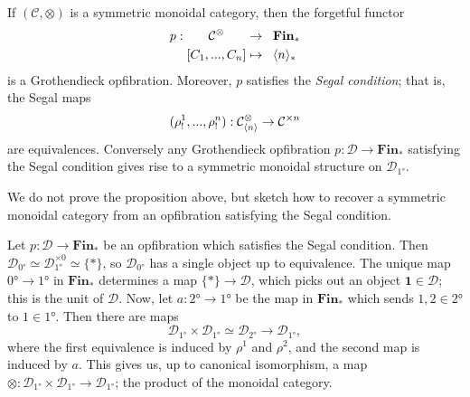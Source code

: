 \documentclass{MetricNotes2023}
\begin{document}
\begin{proposition}\label{prop:segal}
If \((\mathcal{C}, \otimes)\) is a symmetric monoidal category, then the forgetful functor 
\begin{align*}
p : \quad\;\;\, \mathcal{C}^\otimes \quad\;\;\,&\to \;\;\textbf{Fin}_*\\
[C_1, ..., C_n] &\mapsto \;\;\langle n\rangle_*
\end{align*}
is a Grothendieck opfibration. Moreover, \(p\) satisfies the \textit{Segal condition}; that is, the Segal maps 
\[(\rho_!^1, ..., \rho_!^n) : \mathcal{C}^\otimes_{\langle n\rangle}\to \mathcal{C}^{\times n}\]
are equivalences. Conversely any Grothendieck opfibration \(p : \mathcal{D} \to \textbf{Fin}_*\) satisfying the Segal condition gives rise to a symmetric monoidal structure on \(\mathcal{D}_{\ang{1}}\).
\end{proposition}

We do not prove the proposition above, but sketch how to recover a symmetric monoidal category from an opfibration satisfying the Segal condition.

Let \(p : \mathcal{D} \to \textbf{Fin}_*\) be an opfibration which satisfies the Segal condition. Then \(\mathcal{D}_{\ang{0}}\simeq \mathcal{D}_{\ang{1}}^{\times 0}\simeq \{*\}\), so \(\mathcal{D}_{\ang{0}}\) has a single object up to equivalence. The unique map \(\ang{0}\to \ang{1}\) in \(\textbf{Fin}_*\) determines a map \(\{*\}\to \mathcal{D}\), which picks out an object \(\textbf{1}\in \mathcal{D}\); this is the unit of \(\mathcal{D}\). Now, let \(a : \ang{2}\to \ang{1}\) be the map in \(\textbf{Fin}_*\) which sends \(1, 2\in \ang{2}\) to \(1\in \ang{1}\). Then there are maps
\begin{equation}\label{maps}
\mathcal{D}_{\ang{1}}\times \mathcal{D}_{\ang{1}}\simeq \mathcal{D}_{\ang{2}}\to \mathcal{D}_{\ang{1}},
\end{equation}
where the first equivalence is induced by \(\rho^1\) and \(\rho^2\), and the second map is induced by \(a\). This gives us, up to canonical isomorphism, a map \(\otimes : \mathcal{D}_{\ang{1}}\times \mathcal{D}_{\ang{1}}\to \mathcal{D}_{\ang{1}}\); the product of the monoidal category. 
\end{document}
